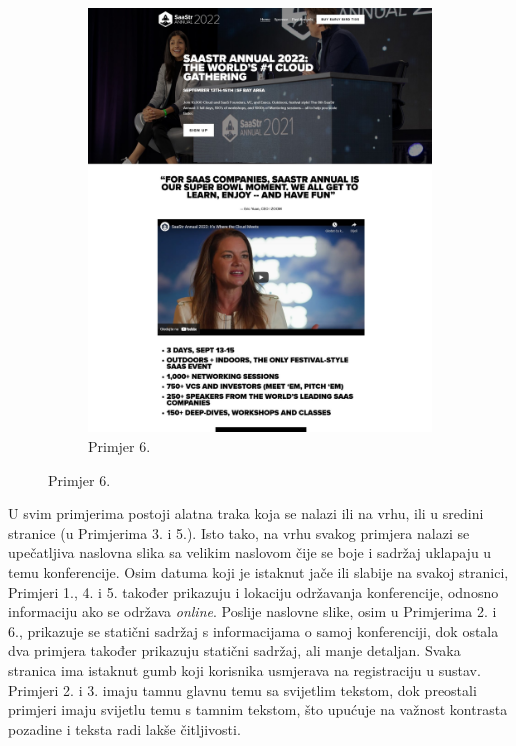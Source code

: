 \begin{figure}[H]
\begin{subfigure}{0.4\linewidth}
				\includegraphics[width=\linewidth]{slike/frontpage_example6}
				\caption{Primjer 6.}
				\label{frontpage_example6}
			\end{subfigure}
		\end{figure}
	
		U svim primjerima postoji alatna traka koja se nalazi ili na vrhu, ili u sredini stranice (u Primjerima 3. i 5.). Isto tako, na vrhu svakog primjera nalazi se upečatljiva naslovna slika sa velikim naslovom čije se boje i sadržaj uklapaju u temu konferencije. Osim datuma koji je istaknut jače ili slabije na svakoj stranici, Primjeri 1., 4. i 5. također prikazuju i lokaciju održavanja konferencije, odnosno informaciju ako se održava \textit{online}. Poslije naslovne slike, osim u Primjerima 2. i 6., prikazuje se statični sadržaj s informacijama o samoj konferenciji, dok ostala dva primjera također prikazuju statični sadržaj, ali manje detaljan. Svaka stranica ima istaknut gumb koji korisnika usmjerava na registraciju u sustav. Primjeri 2. i 3. imaju tamnu glavnu temu sa svijetlim tekstom, dok preostali primjeri imaju svijetlu temu s tamnim tekstom, što upućuje na važnost kontrasta pozadine i teksta radi lakše čitljivosti. 
			
		\eject
		
	